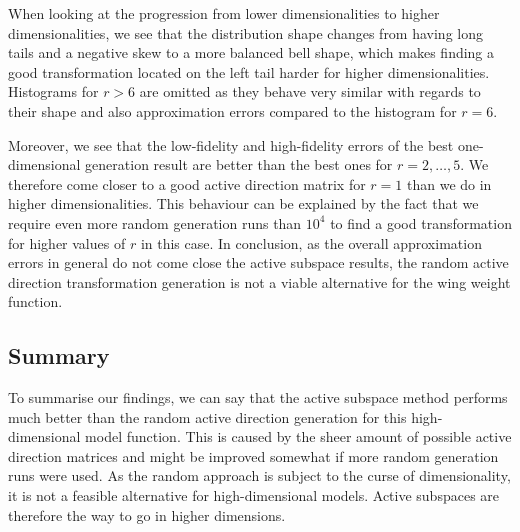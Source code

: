 \documentclass[
  a4paper,  %
  twoside,  %
  bibliography=totoc,
  headsepline,
  cleardoublepage=empty,
  parskip=half,
  draft=false
]{scrbook}
\begin{document}
When looking at the progression from lower dimensionalities to higher dimensionalities, we see that the distribution shape changes from having long tails and a negative skew to a more balanced bell shape, which makes finding a good transformation located on the left tail harder for higher dimensionalities.
Histograms for $r > 6$ are omitted as they behave very similar with regards to their shape and also approximation errors compared to the histogram for $r=6$.

Moreover, we see that the low-fidelity and high-fidelity errors of the best one-dimensional generation result are better than the best ones for $r=2, \dots, 5$.
We therefore come closer to a good active direction matrix for $r=1$ than we do in higher dimensionalities.
This behaviour can be explained by the fact that we require even more random generation runs than $10^4$ to find a good transformation for higher values of $r$ in this case.
In conclusion, as the overall approximation errors in general do not come close the active subspace results, the random active direction transformation generation is not a viable alternative for the wing weight function.

\subsection{Summary}

To summarise our findings, we can say that the active subspace method performs much better than the random active direction generation for this high-dimensional model function.
This is caused by the sheer amount of possible active direction matrices and might be improved somewhat if more random generation runs were used.
As the random approach is subject to the curse of dimensionality, it is not a feasible alternative for high-dimensional models.
Active subspaces are therefore the way to go in higher dimensions.
\end{document}
